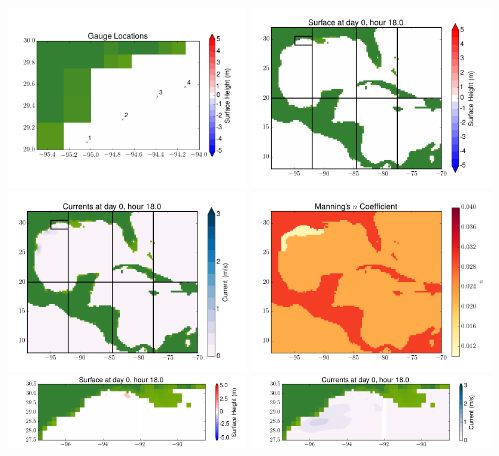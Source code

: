 \documentclass[11pt]{article}
\begin{document}
\includegraphics[width=0.475\textwidth]{frame0089fig10.png}
\vskip 10pt 
\includegraphics[width=0.475\textwidth]{frame0090fig1.png}
\includegraphics[width=0.475\textwidth]{frame0090fig2.png}
\vskip 10pt 
\includegraphics[width=0.475\textwidth]{frame0090fig3.png}
\includegraphics[width=0.475\textwidth]{frame0090fig4.png}
\vskip 10pt 
\includegraphics[width=0.475\textwidth]{frame0090fig5.png}
\end{document}
